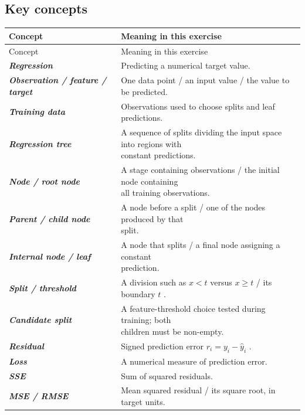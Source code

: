\documentclass{course_sheet}
\begin{document}
\subsection*{Key concepts}
\begingroup
\small
\setlength{\tabcolsep}{4pt}
\begin{longtable}{l|l}
Concept & Meaning in this exercise \\
\hline
\endfirsthead
Concept & Meaning in this exercise \\
\hline
\endhead
\textbf{\textit{Regression}} & Predicting a numerical target value. \\[1.5pt]
\textbf{\textit{Observation / feature / target}} & One data point / an input value / the value to be predicted. \\[1.5pt]
\textbf{\textit{Training data}} & Observations used to choose splits and leaf predictions. \\[1.5pt]
\textbf{\textit{Regression tree}} & \shortstack[l]{A sequence of splits dividing the input space into regions with \\ constant predictions.} \\[1.5pt]
\textbf{\textit{Node / root node}} & \shortstack[l]{A stage containing observations / the initial node containing \\ all training observations.} \\[1.5pt]
\textbf{\textit{Parent / child node}} & \shortstack[l]{A node before a split / one of the nodes produced by that \\ split.} \\[1.5pt]
\textbf{\textit{Internal node / leaf}} & \shortstack[l]{A node that splits / a final node assigning a constant \\ prediction.} \\[1.5pt]
\textbf{\textit{Split / threshold}} & A division such as $x<t$ versus $x\geq t$ / its boundary $t$ . \\[1.5pt]
\textbf{\textit{Candidate split}} & \shortstack[l]{A feature-threshold choice tested during training; both \\ children must be non-empty.} \\[1.5pt]
\textbf{\textit{Residual}} & Signed prediction error $r_i=y_i-\hat y_i$ . \\[1.5pt]
\textbf{\textit{Loss}} & A numerical measure of prediction error. \\[1.5pt]
\textbf{\textit{SSE}} & Sum of squared residuals. \\[1.5pt]
\textbf{\textit{MSE / RMSE}} & Mean squared residual / its square root, in target units. \\[1.5pt]

\end{longtable}
\end{document}
